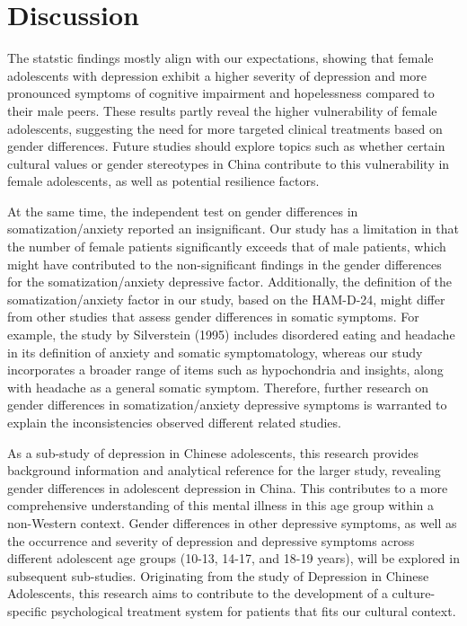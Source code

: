 \documentclass[
  man,floatsintext]{apa6}
\begin{document}
\hypertarget{discussion}{%
\section{Discussion}\label{discussion}}

The statstic findings mostly align with our expectations, showing that female adolescents with depression exhibit a higher severity of depression and more pronounced symptoms of cognitive impairment and hopelessness compared to their male peers. These results partly reveal the higher vulnerability of female adolescents, suggesting the need for more targeted clinical treatments based on gender differences. Future studies should explore topics such as whether certain cultural values or gender stereotypes in China contribute to this vulnerability in female adolescents, as well as potential resilience factors.

At the same time, the independent test on gender differences in somatization/anxiety reported an insignificant. Our study has a limitation in that the number of female patients significantly exceeds that of male patients, which might have contributed to the non-significant findings in the gender differences for the somatization/anxiety depressive factor. Additionally, the definition of the somatization/anxiety factor in our study, based on the HAM-D-24, might differ from other studies that assess gender differences in somatic symptoms. For example, the study by Silverstein (1995) includes disordered eating and headache in its definition of anxiety and somatic symptomatology, whereas our study incorporates a broader range of items such as hypochondria and insights, along with headache as a general somatic symptom. Therefore, further research on gender differences in somatization/anxiety depressive symptoms is warranted to explain the inconsistencies observed different related studies.

As a sub-study of depression in Chinese adolescents, this research provides background information and analytical reference for the larger study, revealing gender differences in adolescent depression in China. This contributes to a more comprehensive understanding of this mental illness in this age group within a non-Western context. Gender differences in other depressive symptoms, as well as the occurrence and severity of depression and depressive symptoms across different adolescent age groups (10-13, 14-17, and 18-19 years), will be explored in subsequent sub-studies. Originating from the study of Depression in Chinese Adolescents, this research aims to contribute to the development of a culture-specific psychological treatment system for patients that fits our cultural context.
\end{document}

